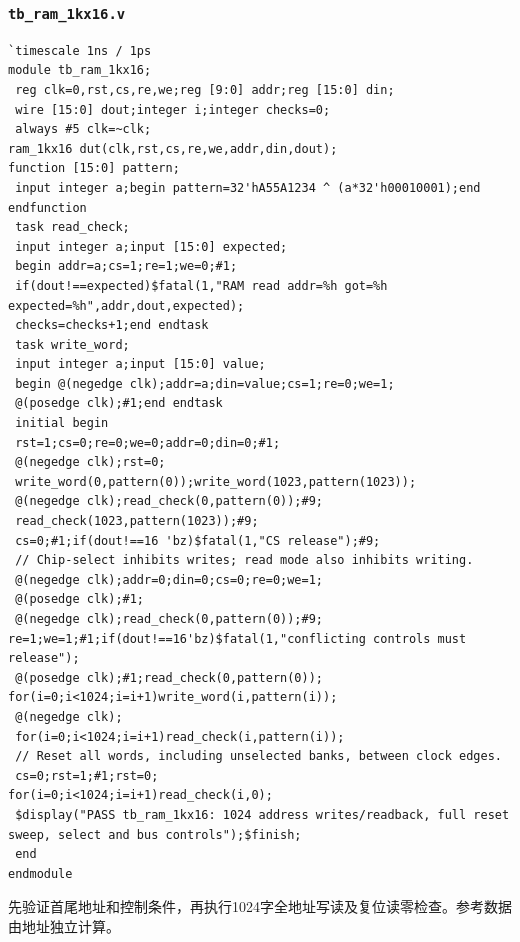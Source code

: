 \documentclass[12pt,a4paper]{ctexart}
\begin{document}
\subsubsection*{\texttt{tb\_ram\_1kx16.v}}
\begin{lstlisting}
`timescale 1ns / 1ps
module tb_ram_1kx16;
 reg clk=0,rst,cs,re,we;reg [9:0] addr;reg [15:0] din;
 wire [15:0] dout;integer i;integer checks=0;
 always #5 clk=~clk;
ram_1kx16 dut(clk,rst,cs,re,we,addr,din,dout);
function [15:0] pattern;
 input integer a;begin pattern=32'hA55A1234 ^ (a*32'h00010001);end endfunction
 task read_check;
 input integer a;input [15:0] expected;
 begin addr=a;cs=1;re=1;we=0;#1;
 if(dout!==expected)$fatal(1,"RAM read addr=%h got=%h expected=%h",addr,dout,expected);
 checks=checks+1;end endtask
 task write_word;
 input integer a;input [15:0] value;
 begin @(negedge clk);addr=a;din=value;cs=1;re=0;we=1;
 @(posedge clk);#1;end endtask
 initial begin
 rst=1;cs=0;re=0;we=0;addr=0;din=0;#1;
 @(negedge clk);rst=0;
 write_word(0,pattern(0));write_word(1023,pattern(1023));
 @(negedge clk);read_check(0,pattern(0));#9;
 read_check(1023,pattern(1023));#9;
 cs=0;#1;if(dout!==16 'bz)$fatal(1,"CS release");#9;
 // Chip-select inhibits writes; read mode also inhibits writing.
 @(negedge clk);addr=0;din=0;cs=0;re=0;we=1;
 @(posedge clk);#1;
 @(negedge clk);read_check(0,pattern(0));#9;
re=1;we=1;#1;if(dout!==16'bz)$fatal(1,"conflicting controls must release");
 @(posedge clk);#1;read_check(0,pattern(0));
for(i=0;i<1024;i=i+1)write_word(i,pattern(i));
 @(negedge clk);
 for(i=0;i<1024;i=i+1)read_check(i,pattern(i));
 // Reset all words, including unselected banks, between clock edges.
 cs=0;rst=1;#1;rst=0;
for(i=0;i<1024;i=i+1)read_check(i,0);
 $display("PASS tb_ram_1kx16: 1024 address writes/readback, full reset sweep, select and bus controls");$finish;
 end
endmodule
\end{lstlisting}
先验证首尾地址和控制条件，再执行1024字全地址写读及复位读零检查。参考数据由地址独立计算。
\end{document}
